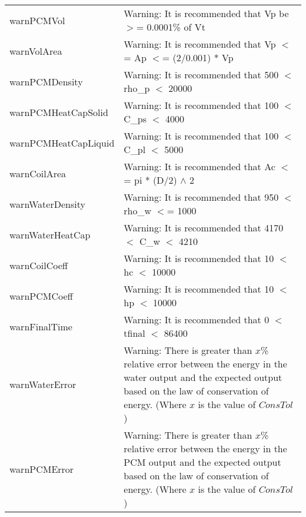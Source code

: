 \documentclass[12pt]{article}
\begin{document}
\begin{longtable}{l p{12cm}}
warnPCMVol & Warning: It is recommended that Vp be $>$= 0.0001\% of Vt \\
warnVolArea & Warning: It is recommended that Vp $<$= Ap $<$= (2/0.001) * Vp \\
warnPCMDensity & Warning: It is recommended that 500 $<$ rho\_p $<$ 20000 \\
warnPCMHeatCapSolid & Warning: It is recommended that 100 $<$ C\_ps $<$ 4000 \\
warnPCMHeatCapLiquid & Warning: It is recommended that 100 $<$ C\_pl $<$ 5000 \\
warnCoilArea & Warning: It is recommended that Ac $<$= pi * (D/2) $\wedge$ 2 \\
warnWaterDensity & Warning: It is recommended that 950 $<$ rho\_w $<$= 1000 \\
warnWaterHeatCap & Warning: It is recommended that 4170 $<$ C\_w $<$ 4210 \\
warnCoilCoeff & Warning: It is recommended that 10 $<$ hc $<$ 10000 \\
warnPCMCoeff & Warning: It is recommended that 10 $<$ hp $<$ 10000 \\
warnFinalTime & Warning: It is recommended that 0 $<$ tfinal $<$ 86400 \\
warnWaterError & Warning: There is greater than $x$\% relative error between the energy in the water output and the expected output based on the law of conservation of energy. (Where $x$ is the value of $ConsTol$) \\
warnPCMError & Warning: There is greater than $x$\% relative error between the energy in the PCM output and the expected output based on the law of conservation of energy. (Where $x$ is the value of $ConsTol$) \\
\bottomrule
\end{longtable}
\end{document}
